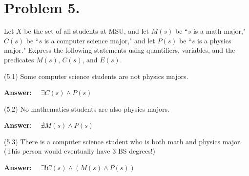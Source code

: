 \documentclass[11pt]{article}
\begin{document}
\section*{Problem 5.}

Let $X$ be the set of all students at MSU, and let $M(s)$ be ``$s$ is a math major," $C(s)$ be ``$s$ is a computer science major," and let $P(s)$ be ``$s$ is a physics major." Express the following statements using quantifiers, variables, and the predicates $M(s)$, $C(s)$, and $E(s)$.
\newline

\noindent
(5.1) Some computer science students are not physics majors.
\newline
\newline

{\bf Answer:}~~ $\exists C(s)\land P(s)$
\newline
\newline

\noindent
(5.2) No mathematics students are also physics majors.
\newline
\newline

{\bf Answer:}~~ $\nexists M(s) \land P(s)$
\newline
\newline

\noindent
(5.3) There is a computer science student who is both math and physics major.
(This person would eventually have 3 BS degrees!)
\newline
\newline

{\bf Answer:}~~ $\exists! C(s) \land (M(s) \land P(s))$
\end{document}
